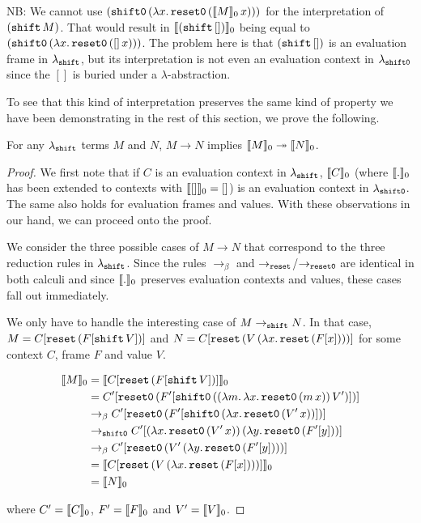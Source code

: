 NB: We cannot use
$(\mathtt{shift0}\,(\lambda x.\, \mathtt{reset0}\,(\llbracket M \rrbracket_0\,x)))$ for the
interpretation of $(\mathtt{shift}\,M)$. That would result in
$\llbracket (\mathtt{shift}\,[]) \rrbracket_0$ being equal to
$(\mathtt{shift0}\,(\lambda x.\, \mathtt{reset0}\,([]\,x)))$. The problem here
is that $(\mathtt{shift}\,[])$ is an evaluation frame in $\lambda_{\mathtt{shift}}$, but
its interpretation is not even an evaluation context in $\lambda_{\mathtt{shift0}}$
since the $[]$ is buried under a $\lambda$-abstraction.

To see that this kind of interpretation preserves the same kind of property
we have been demonstrating in the rest of this section, we prove the
following.

\begin{property}
  \label{prop:simul-semo}
  For any $\lambda_{\mathtt{shift}}$ terms $M$ and $N$, $M \to N$ implies $\llbracket M \rrbracket_0
  \twoheadrightarrow \llbracket N \rrbracket_0$.
\end{property}

\begin{proof}
  We first note that if $C$ is an evaluation context in $\lambda_{\mathtt{shift}}$,
  $\llbracket C \rrbracket_0$ (where $\llbracket . \rrbracket_0$ has been extended to contexts with
  $\llbracket [] \rrbracket_0 = []$) is an evaluation context in $\lambda_{\mathtt{shift0}}$. The same
  also holds for evaluation frames and values. With these observations in
  our hand, we can proceed onto the proof.

  We consider the three possible cases of $M \to N$ that correspond to the
  three reduction rules in $\lambda_{\mathtt{shift}}$. Since the rules $\to_\beta$
  and $\to_{\mathtt{reset}}$/$\to_{\mathtt{reset0}}$ are identical in both calculi and since
  $\llbracket . \rrbracket_0$ preserves evaluation contexts and values, these cases fall out
  immediately.

  We only have to handle the interesting case of $M \to_{\mathtt{shift}} N$. In that
  case, $M = C[\mathtt{reset}\,(F[\mathtt{shift}\,V])]$ and $N =
  C[\mathtt{reset}\,(V\,(\lambda x.\, \mathtt{reset}\,(F[x])))]$ for some
  context $C$, frame $F$ and value $V$.

  \begin{align}
    \llbracket M \rrbracket_0 &= \llbracket C[\mathtt{reset}\,(F[\mathtt{shift}\,V])] \rrbracket_0 \\
             &= C'[\mathtt{reset0}\,(F'[\mathtt{shift0}\,((\lambda m.\, \lambda x.\, \mathtt{reset0}\,(m\,x))\,V')])] \\
             &\to_\beta C'[\mathtt{reset0}\,(F'[\mathtt{shift0}\,(\lambda x.\, \mathtt{reset0}\,(V'\,x))])] \\
             &\to_{\mathtt{shift0}} C'[(\lambda x.\, \mathtt{reset0}\,(V'\,x))\,(\lambda y.\, \mathtt{reset0}\,(F'[y]))] \\
             &\to_\beta C'[\mathtt{reset0}\,(V'\,(\lambda y.\, \mathtt{reset0}\,(F'[y])))] \\
             &= \llbracket C[\mathtt{reset}\,(V\,(\lambda x.\, \mathtt{reset}\,(F[x])))] \rrbracket_0 \\
             &= \llbracket N \rrbracket_0
  \end{align}
  \setcounter{equation}{0}

  where $C' = \llbracket C \rrbracket_0$, $F' = \llbracket F \rrbracket_0$ and $V' = \llbracket V \rrbracket_0$.
\end{proof}

